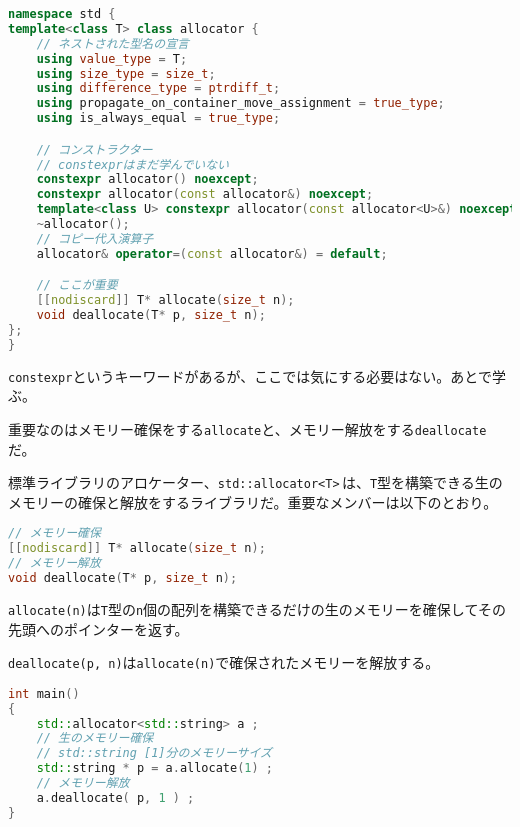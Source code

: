 \begin{lstlisting}[language={C++}]
namespace std {
template<class T> class allocator {
    // ネストされた型名の宣言
    using value_type = T;
    using size_type = size_t;
    using difference_type = ptrdiff_t;
    using propagate_on_container_move_assignment = true_type;
    using is_always_equal = true_type;

    // コンストラクター
    // constexprはまだ学んでいない
    constexpr allocator() noexcept;
    constexpr allocator(const allocator&) noexcept;
    template<class U> constexpr allocator(const allocator<U>&) noexcept;
    ~allocator();
    // コピー代入演算子
    allocator& operator=(const allocator&) = default;

    // ここが重要
    [[nodiscard]] T* allocate(size_t n);
    void deallocate(T* p, size_t n);
};
}
\end{lstlisting}

\texttt{constexpr}というキーワードがあるが、ここでは気にする必要はない。あとで学ぶ。

重要なのはメモリー確保をする\texttt{allocate}と、メモリー解放をする\texttt{deallocate}だ。


標準ライブラリのアロケーター、\texttt{std::allocator<T>}\,は、\texttt{T}型を構築できる生のメモリーの確保と解放をするライブラリだ。重要なメンバーは以下のとおり。

\begin{lstlisting}[language={C++}]
// メモリー確保
[[nodiscard]] T* allocate(size_t n);
// メモリー解放
void deallocate(T* p, size_t n);
\end{lstlisting}

\texttt{allocate(n)}は\texttt{T}型の\texttt{n}個の配列を構築できるだけの生のメモリーを確保してその先頭へのポインターを返す。

\texttt{deallocate(p, n)}は\texttt{allocate(n)}で確保されたメモリーを解放する。

\begin{lstlisting}[language={C++}]
int main()
{
    std::allocator<std::string> a ;
    // 生のメモリー確保
    // std::string [1]分のメモリーサイズ
    std::string * p = a.allocate(1) ;
    // メモリー解放
    a.deallocate( p, 1 ) ;
}
\end{lstlisting}

